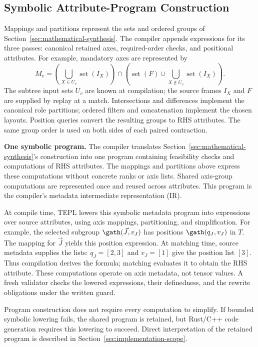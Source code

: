 \subsection{Symbolic Attribute-Program Construction}
\label{sec:symbolic-program-construction}
Mappings and partitions represent the sets and ordered groups of
Section~\ref{sec:mathematical-synthesis}. The compiler appends expressions
for its three passes: canonical retained axes, required-order checks, and
positional attributes. For example, mandatory axes are represented by
\begin{equation}
 M_v=\left(\bigcup_{X\in U_v}\operatorname{set}(I_X)\right)
 \cap\left(\operatorname{set}(F)\cup
             \bigcup_{X\notin U_v}\operatorname{set}(I_X)\right).
 \label{eq:emitted-mandatory}
\end{equation}
The subtree input sets $U_v$ are known at compilation; the source frames
$I_X$ and $F$ are supplied by replay at a match. Intersections and
differences implement the canonical role partitions; ordered filters and
concatenation implement the chosen layouts. Position queries convert the
resulting groups to RHS attributes. The same group order is used on both
sides of each paired contraction.

\noindent\textbf{One symbolic program.}
The compiler translates Section~\ref{sec:mathematical-synthesis}'s construction
into one program containing feasibility checks and computations of RHS
attributes. The mappings and partitions above express these computations
without concrete ranks or axis lists. Shared axis-group computations are
represented once and reused across attributes. This program is the compiler's
metadata intermediate representation (IR).

At compile time, TEPL lowers this symbolic metadata program into expressions
over source attributes, using axis mappings, partitioning, and simplification. For example, the selected subgroup $\gath(\vec J,v_J)$ has
positions $\gath(q_J,v_J)$ in $T$. The mapping for $\vec J$ yields this position
expression. At matching time, source metadata
supplies the lists: $q_J=[2,3]$ and $v_J=[1]$ give the position list $[3]$.
Thus compilation derives the formula; matching evaluates it to obtain the
RHS attribute. These computations operate on axis metadata, not tensor values.
A fresh validator checks the lowered expressions, their definedness,
and the rewrite obligations under the written guard.

Program construction does not require every computation to simplify.
If bounded symbolic lowering fails, the shared program is retained, but
Rust/C++ code generation requires this lowering to succeed. Direct
interpretation of the retained program is described in
Section~\ref{sec:implementation-scope}.

